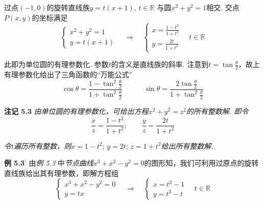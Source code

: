 \documentclass{article}
\begin{document}
过点$(-1,0)$的旋转直线族$y=t(x+1),\,t\in\mathbb{R}$ 与圆$x^{2}+y^{2}=1$相交. 交点$P(x,y)$的坐标满足\[\left\{\begin{array}{c}
     x^{2}+y^{2}=1  \\
     y=t(x+1)
\end{array}\right.\quad \Longrightarrow\quad \left\{\begin{array}{c}
     x=\frac{1-t^{2}}{1+t^{2}}  \\
    y=\frac{2t}{1+t^{2}} 
\end{array}\right.\quad t\in \mathbb{R}\]

此即为单位圆的有理参数化. 参数$t$的含义是直线族的斜率. 注意到$t=\tan\frac{\theta}{2}$，故上有理参数化给出了三角函数的“万能公式”\[\cos{\theta}=\frac{1-\tan^{2}\frac{\theta}{2}}{1+\tan^{2}\frac{\theta}{2}}\qquad \quad \sin\theta=\frac{2\tan\frac{\theta}{2}}{1+\tan^{2}\frac{\theta}{2}}\]

\textbf{注记 5.3} \textit{由单位圆的有理参数化，可给出方程$x^{2}+y^{2}=z^{2}$的所有整数解. 即令}\[\frac{x}{z}=\frac{1-t^{2}}{1+t^{2}};\qquad \frac{y}{z}=\frac{2t}{1+t^{2}}\]

\textit{令$t$遍历所有整数，则$  x=1-t^{2};\,y=2t;\,z=1+t^{2}$给出所有整数解.}

\vspace{3pt}

\textbf{例 5.3$^{\prime}$} 由\textit{例 5.3} 中\textit{节点曲线}$x^{3}+x^{2}-y^{2}=0$的图形知，我们可利用过原点的旋转直线族给出其有理参数，即解方程组\[\left\{\begin{array}{c}
x^{3}+x^{2}-y^{2}=0  \\
     y=tx
\end{array}\right.\quad \Longrightarrow\quad \left\{\begin{array}{c}
    x=t^{2}-1  \\
     y=t^{3}-t
\end{array}\right.\quad t\in \mathbb{R}\]

\begin{center}



\end{center}
\end{document}
